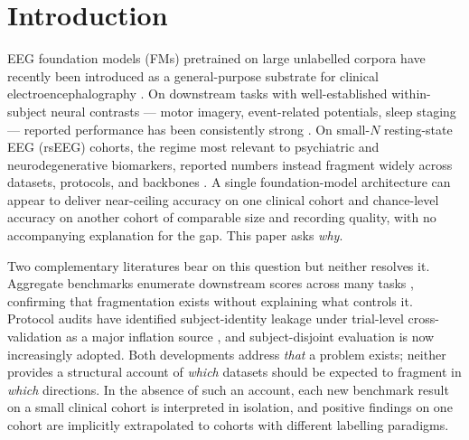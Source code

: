\section{Introduction}
\label{sec:intro}

EEG foundation models (FMs) pretrained on large unlabelled corpora
have recently been introduced as a general-purpose substrate for
clinical electroencephalography
\citep{labram2024,cbramod2025,reve2025}. On downstream tasks with
well-established within-subject neural contrasts --- motor imagery,
event-related potentials, sleep staging --- reported performance has
been consistently strong
\citep{eegfmbench2025,adabrain2025,eegbench2025}. On small-$N$
resting-state EEG (rsEEG) cohorts, the regime most relevant to
psychiatric and neurodegenerative biomarkers, reported numbers
instead fragment widely across datasets, protocols, and backbones
\citep{brain4fms2026,kauffmann2025critique,smalln2025biorxiv}. A
single foundation-model architecture can appear to deliver
near-ceiling accuracy on one clinical cohort and chance-level
accuracy on another cohort of comparable size and recording quality,
with no accompanying explanation for the gap. This paper asks
\emph{why}.

Two complementary literatures bear on this question but neither
resolves it. Aggregate benchmarks enumerate downstream scores across
many tasks
\citep{brain4fms2026,eegfmbench2025,adabrain2025,eegbench2025},
confirming that fragmentation exists without explaining what controls
it. Protocol audits have identified subject-identity leakage under
trial-level cross-validation as a major inflation source
\citep{brookshire2024leakage,smalln2025biorxiv,kauffmann2025critique},
and subject-disjoint evaluation is now increasingly adopted. Both
developments address \emph{that} a problem exists; neither provides a
structural account of \emph{which} datasets should be expected to
fragment in \emph{which} directions. In the absence of such an
account, each new benchmark result on a small clinical cohort is
interpreted in isolation, and positive findings on one cohort are
implicitly extrapolated to cohorts with different labelling
paradigms.


